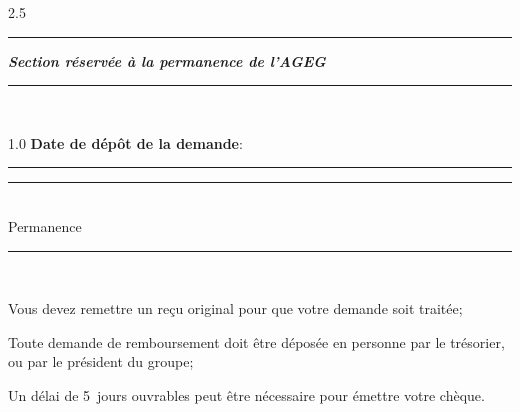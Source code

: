 \documentclass[10pt, A4]{letter}
\begin{document}
\begin{flushleft}
\begin{spacing}{2.5}
	\hfill\noindent\rule{10em}{1pt}\hspace{0.5em}\textbf{\emph{Section réservée à la permanence de l'AGEG}}\hspace{0.5em}\noindent\rule{11em}{1pt}\hfill\\
	\end{spacing}
        \begin{spacing}{1.0}
	\textbf{Date de dépôt de la demande}: \rule{12em}{0.8pt}\hfill\rule{12em}{0.8pt}\hfill\\
	{\footnotesize\hspace{39.25em}Permanence\hfill\\}
	\rule{\textwidth}{1pt}\\\vspace{1em}
	\end{spacing}

        {\singlespacing\footnotesize\item[*] Vous devez remettre un reçu original pour que votre demande soit traitée;\\
        \item[*] Toute demande de remboursement doit être déposée en personne par le trésorier, ou par le président du groupe;\\
        \item[*] Un délai de 5 jours ouvrables peut être nécessaire pour émettre votre chèque.\\}
	\vfill
    \end{flushleft}
\end{document}
